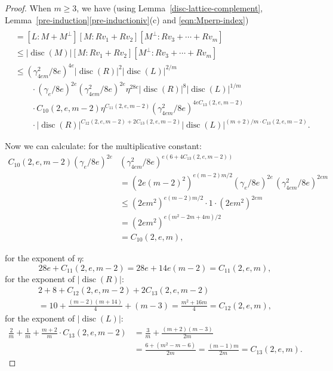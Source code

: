 \documentclass[11pt]{article}
\numberwithin{equation}{section}
\DeclareMathOperator{\disc}{disc}
\newcommand{\abs}[1]{\lvert #1 \rvert}
\begin{document}
\begin{proof}
When $m \geq 3$, we have (using Lemma~\ref{disc-lattice-complement}, Lemma~\ref{pre-induction}\eqref{pre-inductioniv}(c) and \eqref{eqn:Mperp-index})
\begin{align*}
[L : Rv_1 &+ \dotsb + Rv_m]
\\& = [L : M + M^\perp] [M : Rv_1 + Rv_2] [M^\perp : Rv_3 + \dotsb + Rv_m]
\\& \leq \abs{\disc(M)} [M : Rv_1 + Rv_2] [M^\perp : Rv_3 + \dotsb + Rv_m]
\\& \leq (\gamma_{4em}^2/8e)^{4e} \abs{\disc(R)}^2 \abs{\disc(L)}^{2/m}
\\& \qquad \cdot (\gamma_e/8e)^{2e} (\gamma_{4em}^2/8e)^{2e} \eta^{28e} \abs{\disc(R)}^8 \abs{\disc(L)}^{1/m}
\\& \qquad \cdot C_{10}(2,e,m-2) \eta^{C_{11}(2,e,m-2)} (\gamma_{4em}^2/8e)^{4eC_{13}(2,e,m-2)}
\\& \qquad \cdot \abs{\disc(R)}^{C_{12}(2,e,m-2) + 2C_{13}(2,e,m-2)} \abs{\disc(L)}^{(m+2)/m \cdot C_{13}(2,e,m-2)}.
\end{align*}

Now we can calculate:
for the multiplicative constant:
\begin{align*}
C_{10}(2,e,m-2) (\gamma_e/8e)^{2e}& (\gamma_{4em}^2/8e)^{e(6+4C_{13}(2,e,m-2))}
\\& = (2e(m-2)^2)^{e(m-2)m/2} (\gamma_e/8e)^{2e} \, (\gamma_{4em}^2/8e)^{2em}
\\& \leq (2em^2)^{e(m-2)m/2} \cdot 1 \cdot (2em^2)^{2em}
\\& = (2em^2)^{e(m^2-2m + 4m)/2}
\\& = C_{10}(2,e,m),
\end{align*}

for the exponent of $\eta$:
\[
28e + C_{11}(2,e,m-2) = 28e + 14e(m-2) = C_{11}(2,e,m),
\]
for the exponent of $\abs{\disc(R)}$:
\begin{multline*}
2 + 8 + C_{12}(2,e,m-2) + 2C_{13}(2,e,m-2)
\\
= 10 + \frac{(m-2)(m+14)}{4} + (m-3)
= \frac{m^2+16m}{4} = C_{12}(2,e,m),
\end{multline*}
for the exponent of $\abs{\disc(L)}$:
\begin{align*}
\frac{2}{m} + \frac{1}{m} + \frac{m+2}{m} \cdot C_{13}(2,e,m-2)
& = \frac{3}{m} + \frac{(m+2)(m-3)}{2m}
\\& = \frac{6+(m^2-m-6)}{2m} = \frac{(m-1)m}{2m} = C_{13}(2,e,m).
\end{align*}


\end{proof}
\end{document}
